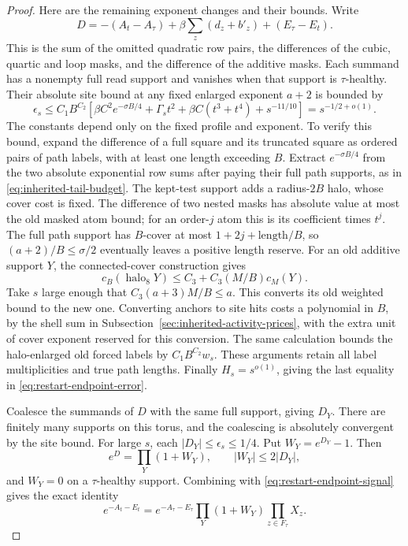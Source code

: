 \begin{proof}
Here are the remaining exponent changes and their bounds. Write
\[
 D=-(A_t-A_\tau)+\beta\sum_z(d_z+b'_z)+(E_\tau-E_t).
\]
This is the sum of the omitted quadratic row pairs, the differences
of the cubic, quartic and loop masks, and the difference of the
additive masks. Each summand has a nonempty full read support and
vanishes when that support is $\tau$-healthy. Their absolute site
bound at any fixed enlarged exponent $a+2$ is bounded by
\begin{equation}\label{eq:restart-endpoint-error}
 \epsilon_s\le C_1B^{C_2}
 \left[\beta C^2e^{-\sigma B/4}
       +\Gamma_st^2+\beta C(t^3+t^4)+s^{-11/10}\right]
                         =s^{-1/2+o(1)}.
\end{equation}
The constants depend only on the fixed profile and exponent. To verify
this bound, expand the difference of a full square and its truncated
square as ordered pairs of path labels, with at least one length
exceeding $B$. Extract $e^{-\sigma B/4}$ from the two absolute
exponential row sums after paying their full path supports, as in
\eqref{eq:inherited-tail-budget}. The kept-test support adds a
radius-$2B$ halo, whose cover cost is fixed. The difference of two
nested masks has absolute value at most the old masked atom bound;
for an order-$j$ atom this is its coefficient times $t^j$.
The full path support has $B$-cover at most $1+2j+\mathrm{length}/B$,
so $(a+2)/B\le\sigma/2$ eventually leaves a positive length reserve.
For an old additive support $Y$, the connected-cover construction gives
\[
 c_B(\operatorname{halo}_8Y)
       \le C_3+C_3(M/B)c_M(Y).
\]
Take $s$ large enough that $C_3(a+3)M/B\le a$. This converts its
old weighted bound to the new one. Converting anchors to site hits
costs a polynomial in $B$, by the shell sum in
Subsection~\ref{sec:inherited-activity-prices}, with the extra unit of
cover exponent reserved for this conversion. The same calculation
bounds the halo-enlarged old forced labels by
$C_1B^{C_2}w_s$. These arguments retain all label multiplicities and
true path lengths. Finally $H_s=s^{o(1)}$, giving the last equality
in \eqref{eq:restart-endpoint-error}.

Coalesce the summands of $D$ with the same full support, giving $D_Y$.
There are finitely many supports on this torus, and the coalescing is
absolutely convergent by the site bound. For large $s$, each
$|D_Y|\le\epsilon_s\le1/4$. Put $W_Y=e^{D_Y}-1$. Then
\[
 e^D=\prod_Y(1+W_Y),\qquad |W_Y|\le2|D_Y|,
\]
and $W_Y=0$ on a $\tau$-healthy support. Combining with
\eqref{eq:restart-endpoint-signal} gives the exact identity
\begin{equation}\label{eq:restart-endpoint-factor}
 e^{-A_t-E_t}=e^{-A_\tau-E_\tau}
                   \prod_Y(1+W_Y)\prod_{z\in F_\tau}X_z.
\end{equation}


\end{proof}
